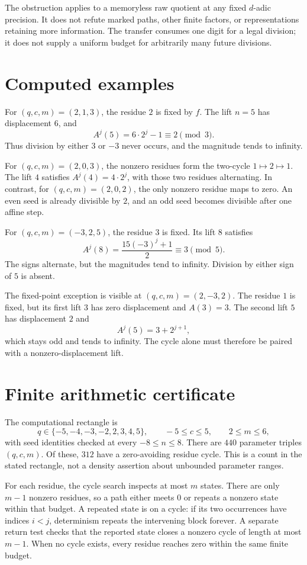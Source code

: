 \documentclass[11pt,letterpaper]{article}
\begin{document}
The obstruction applies to a memoryless raw quotient at any fixed
\(d\)-adic precision. It does not refute marked paths, other finite
factors, or representations retaining more information. The transfer
consumes one digit for a legal division; it does not supply a uniform
budget for arbitrarily many future divisions.

\section{Computed examples}

For \((q,c,m)=(2,1,3)\), the residue \(2\) is fixed by \(f\). The lift \(n=5\) has displacement \(6\), and
\[
  A^j(5)=6\cdot2^j-1\equiv2\pmod3.
\]
Thus division by either \(3\) or \(-3\) never occurs, and the magnitude tends to infinity.

For \((q,c,m)=(2,0,3)\), the nonzero residues form the two-cycle \(1\mapsto2\mapsto1\). The lift \(4\) satisfies \(A^j(4)=4\cdot2^j\), with those two residues alternating. In contrast, for \((q,c,m)=(2,0,2)\), the only nonzero residue maps to zero. An even seed is already divisible by \(2\), and an odd seed becomes divisible after one affine step.

For \((q,c,m)=(-3,2,5)\), the residue \(3\) is fixed. Its lift \(8\) satisfies
\[
  A^j(8)=\frac{15(-3)^j+1}{2}\equiv3\pmod5.
\]
The signs alternate, but the magnitudes tend to infinity. Division by either sign of \(5\) is absent.

The fixed-point exception is visible at \((q,c,m)=(2,-3,2)\). The residue \(1\) is fixed, but its first lift \(3\) has zero displacement and \(A(3)=3\). The second lift \(5\) has displacement \(2\) and
\[
  A^j(5)=3+2^{j+1},
\]
which stays odd and tends to infinity. The cycle alone must therefore be paired with a nonzero-displacement lift.

\section{Finite arithmetic certificate}

The computational rectangle is
\[
  q\in\{-5,-4,-3,-2,2,3,4,5\},\qquad -5\le c\le5,\qquad 2\le m\le6,
\]
with seed identities checked at every \(-8\le n\le8\). There are \(440\) parameter triples \((q,c,m)\). Of these, \(312\) have a zero-avoiding residue cycle. This is a count in the stated rectangle, not a density assertion about unbounded parameter ranges.

For each residue, the cycle search inspects at most \(m\) states. There are only \(m-1\) nonzero residues, so a path either meets \(0\) or repeats a nonzero state within that budget. A repeated state is on a cycle: if its two occurrences have indices \(i<j\), determinism repeats the intervening block forever. A separate return test checks that the reported state closes a nonzero cycle of length at most \(m-1\). When no cycle exists, every residue reaches zero within the same finite budget.
\end{document}
